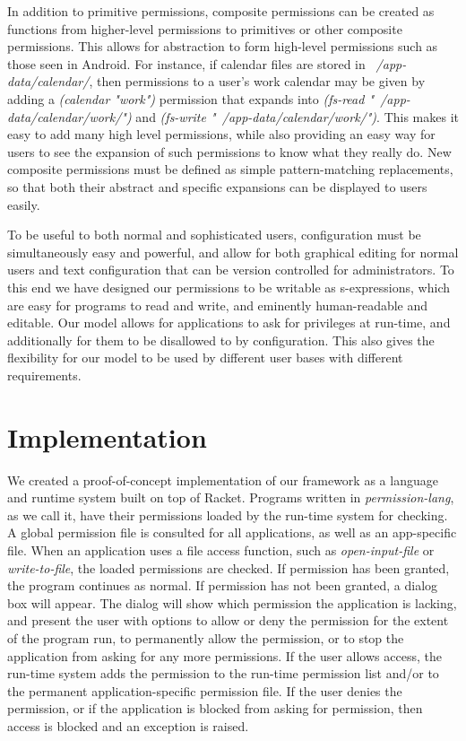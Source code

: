 In addition to primitive permissions, composite permissions can be created as functions from higher-level permissions to primitives or other composite permissions.  This allows for abstraction to form high-level permissions such as those seen in Android.  For instance, if calendar files are stored in \textit{~/app-data/calendar/}, then permissions to a user's work calendar may be given by adding a \textit{(calendar "work")} permission that expands into \textit{(fs-read "~/app-data/calendar/work/")} and \textit{(fs-write "~/app-data/calendar/work/")}.  This makes it easy to add many high level permissions, while also providing an easy way for users to see the expansion of such permissions to know what they really do.  New composite permissions must be defined as simple pattern-matching replacements, so that both their abstract and specific expansions can be displayed to users easily.

To be useful to both normal and sophisticated users, configuration must be simultaneously easy and powerful, and allow for both graphical editing for normal users and text configuration that can be version controlled for administrators.  
To this end we have designed our permissions to be writable as s-expressions, which are easy for programs to read and write, and eminently human-readable and editable.
Our model allows for applications to ask for privileges at run-time, and additionally for them to be disallowed to by configuration.  This also gives the flexibility for our model to be used by different user bases with different requirements.


\section{Implementation}\label{section:implementation}
We created a proof-of-concept implementation of our framework as a language and runtime system built on top of Racket\cite{racket}.  Programs written in \textit{permission-lang}, as we call it, have their permissions loaded by the run-time system for checking.  
A global permission file is consulted for all applications, as well as an app-specific file.  
When an application uses a file access function, such as \textit{open-input-file} or \textit{write-to-file}, the loaded permissions are checked.  
If permission has been granted, the program continues as normal.  
If permission has not been granted, a dialog box will appear.  
The dialog will show which permission the application is lacking, and present the user with options to allow or deny the permission for the extent of the program run, to permanently allow the permission, or to stop the application from asking for any more permissions.
If the user allows access, the run-time system adds the permission to the run-time permission list and/or to the permanent application-specific permission file.
If the user denies the permission, or if the application is blocked from asking for permission, then access is blocked and an exception is raised.

